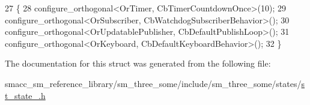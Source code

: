 \begin{DoxyCode}
27     \{
28         configure\_orthogonal<OrTimer, CbTimerCountdownOnce>(10);   
29         configure\_orthogonal<OrSubscriber, CbWatchdogSubscriberBehavior>();
30         configure\_orthogonal<OrUpdatablePublisher, CbDefaultPublishLoop>();
31         configure\_orthogonal<OrKeyboard, CbDefaultKeyboardBehavior>();
32     \}
\end{DoxyCode}


The documentation for this struct was generated from the following file\+:\begin{DoxyCompactItemize}
\item 
smacc\+\_\+sm\+\_\+reference\+\_\+library/sm\+\_\+three\+\_\+some/include/sm\+\_\+three\+\_\+some/states/\hyperlink{sm__three__some_2include_2sm__three__some_2states_2st__state__1_8h}{st\+\_\+state\+\_.\+h}\end{DoxyCompactItemize}
